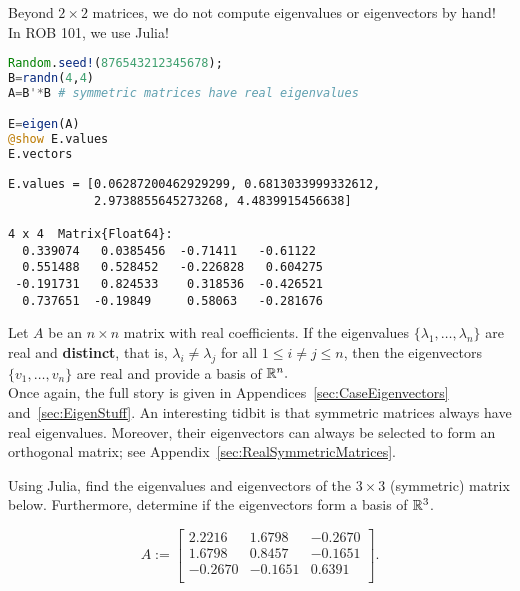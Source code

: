 \documentclass[letterpaper]{book}
\begin{document}
\begin{tcolorbox}[title=\textbf{\Large Finding Eigenvectors and Eigenvalues with Julia}]
Beyond $2 \times 2$ matrices, we do not compute eigenvalues or eigenvectors by hand! In ROB 101, we use Julia!

\begin{lstlisting}[language=Julia,style=mystyle]
Random.seed!(876543212345678);
B=randn(4,4)
A=B'*B # symmetric matrices have real eigenvalues

E=eigen(A)
@show E.values
E.vectors
\end{lstlisting} 
\end{tcolorbox}
\begin{verbatim}
E.values = [0.06287200462929299, 0.6813033999332612, 
            2.9738855645273268, 4.4839915456638]

4 x 4  Matrix{Float64}:
  0.339074   0.0385456  -0.71411   -0.61122
  0.551488   0.528452   -0.226828   0.604275
 -0.191731   0.824533    0.318536  -0.426521
  0.737651  -0.19849     0.58063   -0.281676
\end{verbatim}

\newpage


\vspace*{0.5cm}
\begin{tcolorbox}[sharp corners, colback=green!30, colframe=green!80!blue, title=\textbf{\Large When the Eigenvalues are Real and Distinct, the Eigenvectors form a Basis of $\real^n$}]
Let $A$ be an $n \times n$ matrix with real coefficients. If the eigenvalues $\{ \lambda_1,\ldots, \lambda_n \}$ are real and \textbf{distinct}, that is, $\lambda_i \neq \lambda_j $ for all $1 \le i \neq j \le n$, then the eigenvectors $\{ v_1,\ldots,v_n \}$ are real and provide a basis of $\mathbb R^n.$\\

Once again, the full story is given in Appendices~\ref{sec:CaseEigenvectors} and~\ref{sec:EigenStuff}. An interesting tidbit is that symmetric matrices always have real eigenvalues. Moreover, their eigenvectors can always be selected to form an orthogonal matrix; see Appendix~\ref{sec:RealSymmetricMatrices}.
\end{tcolorbox}

\vspace*{0.5cm}

\begin{example}
\label{ex:BasisEigenvectors}
Using Julia, find the eigenvalues and eigenvectors of the $3 \times 3$ (symmetric) matrix below. Furthermore, determine if the eigenvectors form a basis of $\mathbb R^3$.

\begin{equation}
A:=\left[
\begin{array}{rrr}
2.2216 & 1.6798 & -0.2670 \\
1.6798 & 0.8457 & -0.1651 \\
-0.2670 & -0.1651 & 0.6391 \\
\end{array}
\right].
\end{equation}
\end{example}
\end{document}
